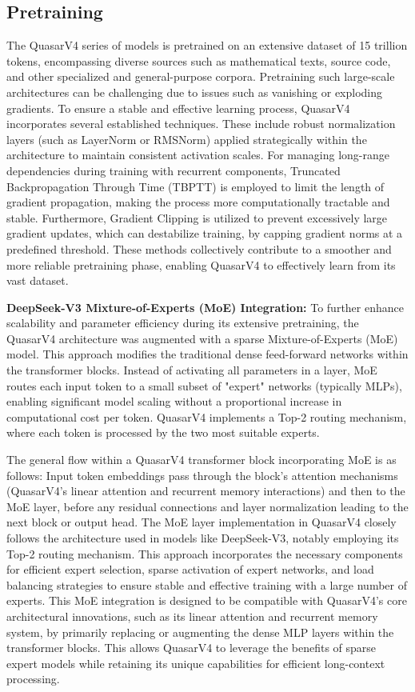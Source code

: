 \documentclass{article}
\begin{document}
\subsection{Pretraining}
\label{sec:pretraining}
The QuasarV4 series of models is pretrained on an extensive dataset of 15 trillion tokens, encompassing diverse sources such as mathematical texts, source code, and other specialized and general-purpose corpora. Pretraining such large-scale architectures can be challenging due to issues such as vanishing or exploding gradients. To ensure a stable and effective learning process, QuasarV4 incorporates several established techniques. These include robust normalization layers (such as LayerNorm or RMSNorm) applied strategically within the architecture to maintain consistent activation scales. For managing long-range dependencies during training with recurrent components, Truncated Backpropagation Through Time (TBPTT) is employed to limit the length of gradient propagation, making the process more computationally tractable and stable. Furthermore, Gradient Clipping is utilized to prevent excessively large gradient updates, which can destabilize training, by capping gradient norms at a predefined threshold. These methods collectively contribute to a smoother and more reliable pretraining phase, enabling QuasarV4 to effectively learn from its vast dataset.

\textbf{DeepSeek-V3 Mixture-of-Experts (MoE) Integration:}
To further enhance scalability and parameter efficiency during its extensive pretraining, the QuasarV4 architecture was augmented with a sparse Mixture-of-Experts (MoE) model. This approach modifies the traditional dense feed-forward networks within the transformer blocks. Instead of activating all parameters in a layer, MoE routes each input token to a small subset of "expert" networks (typically MLPs), enabling significant model scaling without a proportional increase in computational cost per token. QuasarV4 implements a Top-2 routing mechanism, where each token is processed by the two most suitable experts.

The general flow within a QuasarV4 transformer block incorporating MoE is as follows: Input token embeddings pass through the block's attention mechanisms (QuasarV4's linear attention and recurrent memory interactions) and then to the MoE layer, before any residual connections and layer normalization leading to the next block or output head. The MoE layer implementation in QuasarV4 closely follows the architecture used in models like DeepSeek-V3, notably employing its Top-2 routing mechanism. This approach incorporates the necessary components for efficient expert selection, sparse activation of expert networks, and load balancing strategies to ensure stable and effective training with a large number of experts.
This MoE integration is designed to be compatible with QuasarV4's core architectural innovations, such as its linear attention and recurrent memory system, by primarily replacing or augmenting the dense MLP layers within the transformer blocks. This allows QuasarV4 to leverage the benefits of sparse expert models while retaining its unique capabilities for efficient long-context processing.
\end{document}
